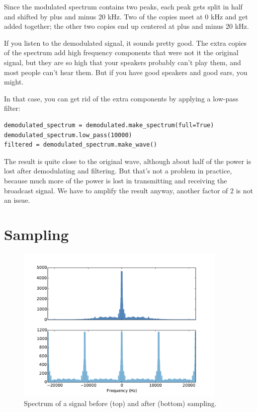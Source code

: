 \documentclass[12pt]{book}
\begin{document}
Since the modulated spectrum contains two peaks, each peak gets split
in half and shifted by plus and minus 20 kHz.  Two of the copies
meet at 0 kHz and get added together; the other two copies end up
centered at plus and minus 20 kHz.

If you listen to the demodulated signal, it sounds pretty good.  The
extra copies of the spectrum add high frequency components that were
not it the original signal, but they are so high that your speakers
probably can't play them, and most people can't hear them.  But if
you have good speakers and good ears, you might.

In that case, you can get rid of the extra components by applying a
low-pass filter:

\begin{verbatim}
demodulated_spectrum = demodulated.make_spectrum(full=True)
demodulated_spectrum.low_pass(10000)
filtered = demodulated_spectrum.make_wave()
\end{verbatim}

The result is quite close to the original wave, although about half
of the power is lost after demodulating and filtering.  But that's not
a problem in practice, because much more of the power is lost in
transmitting and receiving the broadcast signal.  We have to amplify
the result anyway, another factor of 2 is not an issue.


\section{Sampling}

\begin{figure}
\centerline{\includegraphics[height=3.0in]{figs/sampling3.pdf}}
\caption{Spectrum of a signal before (top) and after (bottom) sampling.}
\label{fig.sampling3}
\end{figure}
\end{document}
